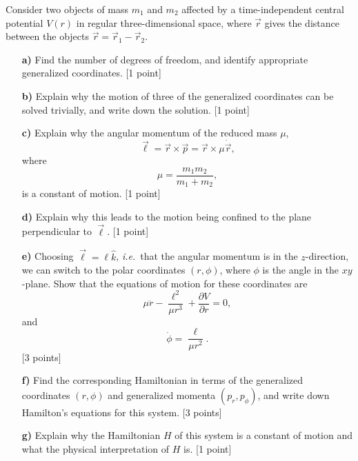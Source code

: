 \documentclass[11pt,a4paper]{report}
\newcounter{excount}[chapter]
\newenvironment{exercise}[1][]{\addtocounter{excount}{1} \noindent {\bf Question
    \arabic{excount} \ \ #1}\hspace{2mm}}{\vspace{4mm}}
\begin{document}
\begin{exercise}{\bf Central potentials\\}
Consider two objects of mass $m_1$ and $m_2$ affected by a time-independent central potential $V(r)$ in regular three-dimensional space, where $\vec r$ gives the distance between the objects $\vec r = \vec r_1- \vec r_2$.

\begin{itemize}
\item[{\bf a)}] Find the number of degrees of freedom, and identify appropriate generalized coordinates. [1 point]
\item[{\bf b)}] Explain why the motion of three of the generalized coordinates can be solved trivially, and write down the solution. [1 point]
\item[{\bf c)}] Explain why the angular momentum of the reduced mass $\mu$,
\begin{equation}
\vec\ell = \vec r \times \vec p= \vec r \times \mu\dot{\vec r},
\end{equation}
where
\begin{equation}
\mu= \frac{m_1m_2}{m_1+m_2},
\end{equation}
is a constant of motion.
[1 point]
\item[{\bf d)}] Explain why this leads to the motion being confined to the plane perpendicular to $\vec\ell$. [1 point]
\item[{\bf e)}] Choosing $\vec\ell= \ell\hat k$, {\it i.e.}\ that the angular momentum is in the $z$-direction, we can switch to the polar coordinates $(r,\phi)$, where $\phi$ is the angle in the $xy$-plane. Show that the equations of motion for these coordinates are
\begin{equation}
\mu\ddot r-\frac{\ell^2}{\mu r^3}+\frac{\partial V}{\partial r}=0,\label{eq:LEQ_r}
\end{equation}
and
\begin{equation}
\dot\phi=\frac{\ell}{\mu r^2}\label{eq:LEQ_phi}.
\end{equation}
[3 points]
\item[{\bf f)}] Find the corresponding Hamiltonian in terms of the generalized coordinates $(r,\phi)$ and generalized momenta $(p_r,p_\phi)$, and write down Hamilton's equations for this system.  [3 points]
\item[{\bf g)}] Explain why the Hamiltonian $H$ of this system is a constant of motion and what the physical interpretation of $H$ is. [1 point]
\end{itemize}
\end{exercise}
\end{document}
